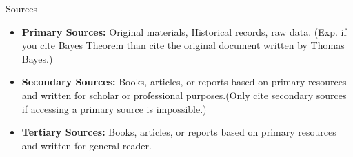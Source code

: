 \documentclass{beamer}
\begin{document}
	\begin{frame}
		\begin{block}{Sources}
		\end{block}
		\begin{itemize}
			 \item \textbf{Primary Sources:} Original materials, Historical records, raw data. (Exp. if you cite Bayes Theorem  than cite the original document written by Thomas Bayes.)
			\onslide<2-> \item \textbf{Secondary Sources:} Books, articles, or reports based on primary resources and written for scholar or professional purposes.(Only cite secondary sources if accessing a primary source is impossible.) 
			\onslide<3-> \item \textbf{Tertiary Sources:} Books, articles, or reports based on primary resources and written for general reader. 
		\end{itemize}
	\end{frame}
	
\end{document}
